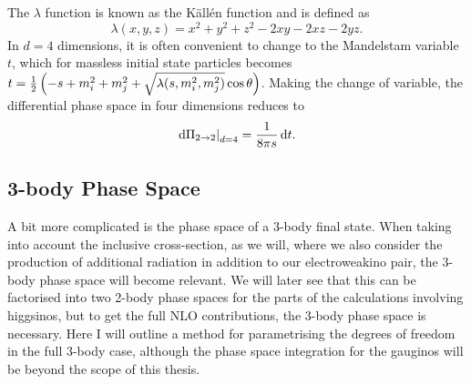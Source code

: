\documentclass[../main.tex]{subfiles}
\begin{document}
The \(\lambda\) function is known as the Källén function and is defined as
\begin{equation}
  \label{pc:eq:kallen}
  \lambda(x, y, z) = x^2 + y^2 + z^2  - 2xy - 2xz - 2yz.
\end{equation}
In \(d=4\) dimensions, it is often convenient to change to the Mandelstam
variable \(t\), which for massless initial state particles becomes
\(t=\frac{1}{2}\left(-s+m_i^2+m_j^2+\sqrt{\lambda(s,m_i^2,m_j^2)}\cos\theta\right)\).
Making the change of variable, the differential phase space in four dimensions reduces to
\begin{equation}
  \label{pc:eq:dPi_dt}
  \left.\mathrm{d}\Pi_{2\to 2}\right|_{d=4} = \frac{1}{8\pi s} \,\mathrm{d}t.
\end{equation}


\subsection{3-body Phase Space}
A bit more complicated is the phase space of a 3-body final state.
When taking into account the inclusive cross-section, as we will, where we also consider the production of additional radiation in addition to our electroweakino pair, the 3-body phase space will become relevant.
We will later see that this can be factorised into two 2-body phase spaces for the parts of the calculations involving higgsinos, but to get the full NLO contributions, the 3-body phase space is necessary.
Here I will outline a method for parametrising the degrees of freedom in the full 3-body case, although the phase space integration for the gauginos will be beyond the scope of this thesis.
\medskip
\end{document}

